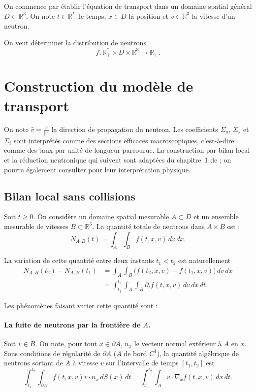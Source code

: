 \documentclass{article}
\begin{document}
On commence par établir l'équation de transport dans un domaine spatial général $D\subset\mathbb{R}^3$. On note $t \in \mathbb{R}^*_+$ le temps, $x\in D$ la position et $v \in \mathbb{R}^3$ la vitesse d'un neutron.

On veut déterminer la distribution de neutrons
\[
f : \mathbb{R}^*_+ \times D \times \mathbb{R}^3
\longrightarrow \mathbb{R}_+.
\]

\bigskip
\bigskip

\section{Construction du modèle de transport}
On note \(\widehat v=\frac{v}{|v|}\) la direction de propagation du neutron. Les coefficients $\Sigma_a$, $\Sigma_s$ et $\Sigma_t$ sont interprétés comme des sections efficaces macroscopiques, c'est-à-dire comme des taux par unité de longueur parcourue.
La construction par bilan local et la réduction neutronique qui suivent sont adaptées du chapitre~1 de \textcite{Allaire2018}; on pourra également consulter \textcite{BellGlasstone1970} pour leur interprétation physique.
\subsection{Bilan local sans collisions}

Soit $t \geq 0$. On considère un domaine spatial mesurable $A \subset D$ et un ensemble mesurable de vitesses $B \subset \mathbb{R}^3$.
La quantité totale de neutrons dans $A \times B$ est :
\[
N_{A,B}(t) = \int_A \int_B f(t,x,v)\,dv\,dx.
\]

La variation de cette quantité entre deux instants $t_1 < t_2$ est naturellement
\[
\begin{aligned}
N_{A,B}(t_2)-N_{A,B}(t_1)
&=
\int_A\int_B
\bigl(f(t_2,x,v)-f(t_1,x,v)\bigr)\,dv\,dx \\
&=
\int_{t_1}^{t_2}\int_A\int_B
\partial_t f(t,x,v)\,dv\,dx\,dt.
\end{aligned}
\]

Les phénomènes faisant varier cette quantité sont :

\paragraph{La fuite de neutrons par la frontière de $A$.} Soit $v \in B$. On note, pour tout $x \in \partial A$, $n_x$ le vecteur normal extérieur à $A$ en $x$. Sous conditions de régularité de $\partial A$ ($A$ de bord $C^1$), la quantité algébrique de neutrons sortant de $A$ à vitesse $v$ sur l’intervalle de temps $[t_1,t_2]$ est
\[
\int_{t_1}^{t_2}\int_{\partial A}
f(t,x,v)v\cdot n_x\,dS(x)\,dt
=
\int_{t_1}^{t_2}\int_A
v\cdot\nabla_x f(t,x,v)\,dx\,dt.
\]
\end{document}
